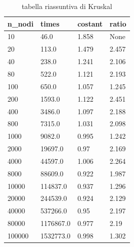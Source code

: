 \renewcommand{\arraystretch}{2}
\begin{longtable}[H]{|p{2cm}|p{3cm}|p{2cm}|p{3cm}|} 
    \rowcolor{white}
\multicolumn{4}{c}{Continua alla pagina seguente...}
\endfoot
\rowcolor{white}
\caption{tabella riassuntiva di Kruskal}
\label{tab:tabellaKruskal}
\endlastfoot
\hline
    \rowcolor{lightgray}
    \textbf{n\_nodi} & \textbf{times} & \textbf{costant} & \textbf{ratio} \\ \hline\hline
    \endhead
    10	&	    46.0	&		1.858 &		None \\ \hline
    20	&	    113.0	&		1.479 &		2.457 \\ \hline
    40	&	    238.0	&		1.241 &		2.106 \\ \hline
    80	&	    522.0	&		1.121 &		2.193 \\ \hline
    100	&	    650.0	&		1.057 &		1.245 \\ \hline
    200	&	    1593.0	&		1.122 &		2.451 \\ \hline
    400	&	    3486.0	&		1.097 &		2.188 \\ \hline
    800	&	    7315.0	&		1.031 &		2.098 \\ \hline
    1000 &	    9082.0	&		0.995 &		1.242 \\ \hline
    2000 &	    19697.0	&		0.97  &  	2.169 \\ \hline
    4000 &	    44597.0	&	    1.006 &		2.264 \\ \hline
    8000 &		88609.0	&	    0.922 &		1.987 \\ \hline
    10000 &		114837.0 &		0.937 &		1.296 \\ \hline
    20000 &		244539.0 &		0.924 &		2.129 \\ \hline
    40000 &		537266.0 &		0.95 &		2.197 \\ \hline
    80000 &		1176867.0 &		0.977 &	    2.19 \\ \hline
    100000 &	1532773.0 &		0.998 &	    1.302 \\ \hline
\end{longtable}

